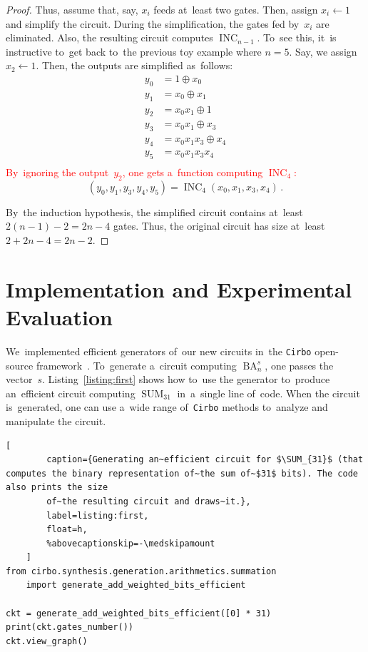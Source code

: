 \documentclass[a4paper, UKenglish, cleveref, autoref,  thm-restate]{lipics-v2021}
\DeclareMathOperator{\SUM}{SUM}
\DeclareMathOperator{\BA}{BA}
\DeclareMathOperator{\INC}{INC}
\begin{document}
\begin{proof}
        Thus, assume that, say, $x_i$ feeds at~least two gates. Then, assign $x_i \gets 1$ and simplify the circuit. During the simplification, the gates fed by~$x_i$ are eliminated. Also, the resulting circuit computes $\INC_{n-1}$. To~see this,
        it~is instructive
        to~get back to~the previous toy example where $n=5$. Say, we assign $x_2 \gets 1$. Then, the outputs are simplified as~follows:
        \begin{align*}
            y_0 &= 1 \oplus x_0\\
            y_1 &= x_0 \oplus x_1\\
            y_2 &= x_0x_1 \oplus 1\\
            y_3 &= x_0x_1 \oplus x_3\\
            y_4 &= x_0x_1x_3 \oplus x_4\\
            y_5 &= x_0x_1x_3x_4\\
        \end{align*}
        \textcolor{red}{By~ignoring the output~$y_2$, one gets a~function computing $\INC_4$:}
        \[(y_0,y_1,y_3,y_4,y_5)=\INC_4(x_0, x_1, x_3, x_4)\,.\]

        By~the induction hypothesis, the simplified circuit contains at~least $2(n-1)-2=2n-4$ gates. Thus, the original circuit has size at~least $2+2n-4=2n-2$.
    \end{proof}


    \section{Implementation and Experimental Evaluation}

    We~implemented efficient generators of~our new circuits in~the \texttt{Cirbo} open-source framework~\cite{DBLP:conf/aaai/AverkovBEGKKKLL25}.
    To~generate a~circuit computing $\BA_n^s$, one passes the vector~$s$. Listing~\ref{listing:first} shows how to~use the generator
    to~produce an~efficient circuit computing $\SUM_{31}$ in~a~single line of~code.
    When the circuit is~generated, one can use a~wide range of~\texttt{Cirbo} methods to~analyze and manipulate the circuit.

    \begin{lstlisting}[
        caption={Generating an~efficient circuit for $\SUM_{31}$ (that computes the binary representation of~the sum of~$31$ bits). The code also prints the size
        of~the resulting circuit and draws~it.},
        label=listing:first,
        float=h,
        %abovecaptionskip=-\medskipamount
    ]
from cirbo.synthesis.generation.arithmetics.summation
    import generate_add_weighted_bits_efficient

ckt = generate_add_weighted_bits_efficient([0] * 31)
print(ckt.gates_number())
ckt.view_graph()
    \end{lstlisting}
\end{document}
